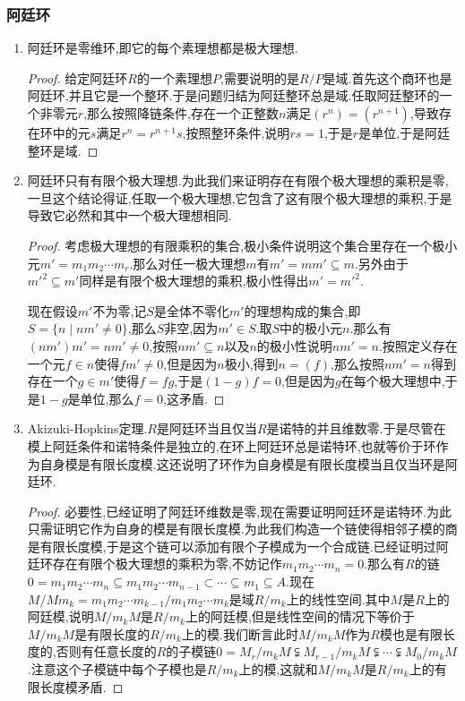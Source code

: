 \subsubsection{阿廷环}
\begin{enumerate}
	\item 阿廷环是零维环,即它的每个素理想都是极大理想.
	\begin{proof}
		
		给定阿廷环$R$的一个素理想$P$,需要说明的是$R/P$是域.首先这个商环也是阿廷环,并且它是一个整环.于是问题归结为阿廷整环总是域.任取阿廷整环的一个非零元$r$,那么按照降链条件,存在一个正整数$n$满足$(r^n)=(r^{n+1})$,导致存在环中的元$s$满足$r^n=r^{n+1}s$,按照整环条件,说明$rs=1$,于是$r$是单位,于是阿廷整环是域.
	\end{proof}
    \item 阿廷环只有有限个极大理想.为此我们来证明存在有限个极大理想的乘积是零,一旦这个结论得证,任取一个极大理想,它包含了这有限个极大理想的乘积,于是导致它必然和其中一个极大理想相同.
    \begin{proof}
    	
    	考虑极大理想的有限乘积的集合,极小条件说明这个集合里存在一个极小元$m'=m_1m_2\cdots m_r$.那么对任一极大理想$m$有$m'=mm'\subseteq m$.另外由于$m'^2\subseteq m'$同样是有限个极大理想的乘积,极小性得出$m'=m'^2$.
    	
    	现在假设$m'$不为零,记$S$是全体不零化$m'$的理想构成的集合,即$S=\{n\mid nm'\not=0\}$,那么$S$非空,因为$m'\in S$.取$S$中的极小元$n$.那么有$(nm')m'=nm'\not=0$,按照$nm'\subseteq n$以及$n$的极小性说明$nm'=n$.按照定义存在一个元$f\in n$使得$fm'\not=0$,但是因为$n$极小,得到$n=(f)$,那么按照$nm'=n$得到存在一个$g\in m'$使得$f=fg$,于是$(1-g)f=0$,但是因为$g$在每个极大理想中,于是$1-g$是单位,那么$f=0$,这矛盾.
    \end{proof}
    \item Akizuki-Hopkins定理.$R$是阿廷环当且仅当$R$是诺特的并且维数零.于是尽管在模上阿廷条件和诺特条件是独立的,在环上阿廷环总是诺特环,也就等价于环作为自身模是有限长度模.这还说明了环作为自身模是有限长度模当且仅当环是阿廷环.
    \begin{proof}
    	
    	必要性,已经证明了阿廷环维数是零,现在需要证明阿廷环是诺特环.为此只需证明它作为自身的模是有限长度模.为此我们构造一个链使得相邻子模的商是有限长度模,于是这个链可以添加有限个子模成为一个合成链.已经证明过阿廷环存在有限个极大理想的乘积为零,不妨记作$m_1m_2\cdots m_n=0$.那么有$R$的链$0=m_1m_2\cdots m_n\subseteq m_1m_2\cdots m_{n-1}\subset\cdots\subseteq m_1\subseteq A$.现在$M/Mm_k=m_1m_2\cdots m_{k-1}/m_1m_2\cdots m_k$是域$R/m_k$上的线性空间.其中$M$是$R$上的阿廷模,说明$M/m_kM$是$R/m_k$上的阿廷模,但是线性空间的情况下等价于$M/m_kM$是有限长度的$R/m_k$上的模.我们断言此时$M/m_kM$作为$R$模也是有限长度的,否则有任意长度的$R$的子模链$0=M_r/m_kM\subsetneqq M_{r-1}/m_kM\subsetneqq\cdots\subsetneqq M_0/m_kM$.注意这个子模链中每个子模也是$R/m_k$上的模,这就和$M/m_kM$是$R/m_k$上的有限长度模矛盾.
    	

\end{proof}
\end{enumerate}
